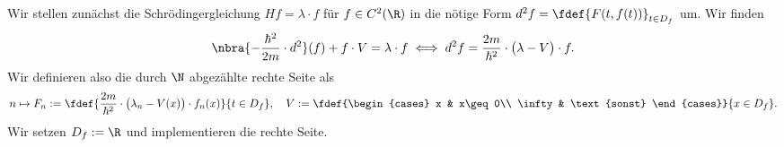 \documentclass[
    oneside,
    ngerman,
    footinclude=false,
    captions=tableheading,
    DIV=12
]{scrartcl}
\begin{document}
    \aufgabe{}
        \subaufgabe{}
            Wir stellen zunächst die Schrödingergleichung $Hf = \lambda\cdot f$ für $f\in C^2(\R)$ in die nötige Form $d^2f = \fdef{F(t,f(t))}_{t\in D_f}$ um. Wir finden 
            \begin{align*}
                \nbra{-\frac{\hbar^2}{2m}\cdot d^2}(f) + f\cdot V = \lambda\cdot f\iff d^2f = \frac{2m}{\hbar^2}\cdot\big(\lambda - V\big)\cdot f.
            \end{align*}
            Wir definieren also die durch $\N$ abgezählte rechte Seite als
            \[
                n\mapsto F_n:=\fdef{\frac{2m}{\hbar^2}\cdot\big(\lambda_n - V(x)\big)\cdot f_n(x)}{t\in D_f},\quad V:=\fdef{\begin{cases}
                    x & x\geq 0\\
                    \infty & \text{sonst}
                \end{cases}}{x\in D_f}.
            \]
            Wir setzen $D_f:=\R$ und implementieren die rechte Seite.
            
\end{document}
